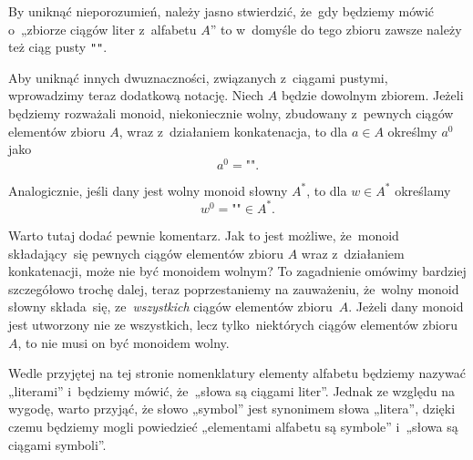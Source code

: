 \documentclass[a4paper,11pt]{article}
\begin{document}
\vspace{\spaceFour}





\start {} By uniknąć nieporozumień, należy jasno stwierdzić, że~gdy
będziemy mówić o~„zbiorze ciągów liter z~alfabetu $A$” to w~domyśle do tego
zbioru zawsze należy też ciąg pusty \texttt{""}.

Aby uniknąć innych dwuznaczności, związanych z~ciągami pustymi, wprowadzimy
teraz dodatkową notację. Niech $A$ będzie dowolnym zbiorem. Jeżeli
będziemy rozważali monoid, niekoniecznie wolny, zbudowany z~pewnych ciągów
elementów zbioru $A$, wraz z~działaniem konkatenacja, to dla $a \in A$
określmy $a^{ 0 }$ jako
\begin{equation}
  \label{eq:Forys-Forys-???}
  a^{ 0 } = \texttt{""}.
\end{equation}

Analogicznie, jeśli dany jest wolny monoid słowny $A^{ * }$, to dla
$w \in A^{ * }$ określamy
\begin{equation}
  \label{eq:Forys-Forys-???}
  w^{ 0 } = \texttt{""} \in A^{ * }.
\end{equation}

Warto tutaj dodać pewnie komentarz. Jak to jest możliwe, że~monoid
składający~się pewnych ciągów elementów zbioru $A$ wraz z~działaniem
konkatenacji, może nie być monoidem wolnym? To zagadnienie omówimy bardziej
szczegółowo trochę dalej, teraz poprzestaniemy na zauważeniu, że~wolny
monoid słowny składa~się, ze~\textit{wszystkich} ciągów elementów
zbioru~$A$. Jeżeli dany monoid jest utworzony nie ze wszystkich, lecz
tylko~niektórych ciągów elementów zbioru~$A$, to nie musi on być monoidem
wolny.

\vspace{\spaceFour}





\start {} Wedle przyjętej na tej stronie nomenklatury elementy
alfabetu będziemy nazywać „literami” i~będziemy mówić, że~„słowa są
ciągami liter”. Jednak ze względu na wygodę, warto przyjąć, że słowo
„symbol” jest synonimem słowa „litera”, dzięki czemu będziemy mogli
powiedzieć „elementami alfabetu są symbole” i~„słowa są ciągami
symboli”.

\vspace{\spaceFour}
\end{document}
